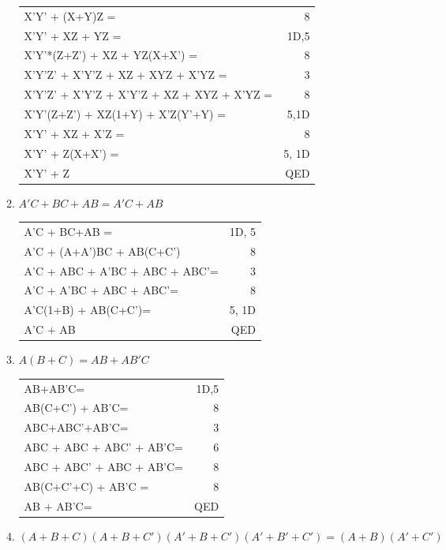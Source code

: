 \begin{enumerate}
\begin{enumerate}
\begin{solution}{
\begin{tabular}{lr}
X'Y' + (X+Y)Z = 				& 8\\
X'Y' + XZ + YZ = 				& 1D,5 \\
X'Y'*(Z+Z') + XZ + YZ(X+X') =  			& 8 \\
X'Y'Z' + X'Y'Z + XZ + XYZ + X'YZ =  		& 3 \\
X'Y'Z' + X'Y'Z + X'Y'Z + XZ + XYZ + X'YZ =  	& 8 \\
X'Y'(Z+Z') + XZ(1+Y) + X'Z(Y'+Y) =  		& 5,1D \\
X'Y' + XZ + X'Z  =  				& 8 \\
X'Y' + Z(X+X') =  				& 5, 1D\\
X'Y' + Z 					& QED \\
\end{tabular} }\end{solution}

	\item $A'C+BC+AB = A'C+AB$

\begin{solution}{
\begin{tabular}{lr}
A'C + BC+AB =  					& 1D, 5 \\
A'C + (A+A')BC + AB(C+C') 			& 8  \\
A'C + ABC + A'BC + ABC + ABC'= 			& 3\\
A'C + A'BC + ABC + ABC'= 			& 8\\
A'C(1+B) + AB(C+C')= 				& 5, 1D\\
A'C + AB 					& QED \\
\end{tabular} }\end{solution}
	\item $A(B+C)=AB+AB'C$

\begin{solution}{
\begin{tabular}{lr}
AB+AB'C= 					& 1D,5\\
AB(C+C') + AB'C= 				& 8 \\
ABC+ABC'+AB'C= 					& 3 \\
ABC + ABC + ABC' + AB'C= 			& 6\\
ABC + ABC' + ABC + AB'C= 			& 8\\
AB(C+C'+C) + AB'C = 				& 8\\	
AB + AB'C= 					& QED\\
\end{tabular}	}\end{solution}
	\item $(A+B+C)(A+B+C')(A'+B+C')(A'+B'+C') = (A+B)(A'+C')$


\end{enumerate}
\end{enumerate}
